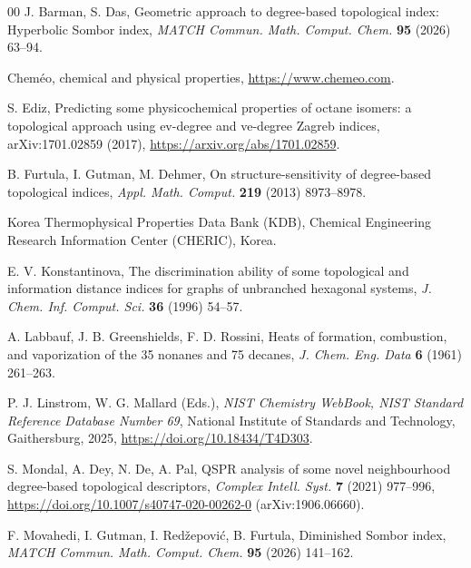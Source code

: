\documentclass[a5paper, 10pt]{article}
\theoremstyle{plain}
\theoremstyle{remark}
\theoremstyle{definition}
\begin{document}
\singlespacing
\begin{thebibliography}{00}
   J. Barman, S. Das, Geometric approach to
  degree-based topological index: Hyperbolic Sombor index, \textit{MATCH
  Commun. Math. Comput. Chem.\/} \textbf{95} (2026) 63--94.

   Chem\'eo, chemical and physical properties,
  \url{https://www.chemeo.com}.

  S. Ediz, Predicting some physicochemical properties of octane isomers:
  a topological approach using ev-degree and ve-degree Zagreb indices,
  arXiv:1701.02859 (2017), \url{https://arxiv.org/abs/1701.02859}.

   B. Furtula, I. Gutman, M. Dehmer, On
  structure-sensitivity of degree-based topological indices, \textit{Appl.
  Math. Comput.\/} \textbf{219} (2013) 8973--8978.

   Korea Thermophysical Properties Data Bank (KDB), Chemical
  Engineering Research Information Center (CHERIC), Korea.

   E. V. Konstantinova, The
  discrimination ability of some topological and information distance indices
  for graphs of unbranched hexagonal systems, \textit{J. Chem. Inf. Comput.
  Sci.\/} \textbf{36} (1996) 54--57.

   A. Labbauf, J. B. Greenshields,
  F. D. Rossini, Heats of formation, combustion, and vaporization of the
  35 nonanes and 75 decanes, \textit{J. Chem. Eng. Data\/} \textbf{6}
  (1961) 261--263.

   P. J. Linstrom, W. G. Mallard (Eds.), \textit{NIST
  Chemistry WebBook, NIST Standard Reference Database Number 69\/}, National
  Institute of Standards and Technology, Gaithersburg, 2025,
  \url{https://doi.org/10.18434/T4D303}.

  S. Mondal, A. Dey, N. De, A. Pal, QSPR analysis of some novel
  neighbourhood degree-based topological descriptors, \textit{Complex
  Intell. Syst.\/} \textbf{7} (2021) 977--996,
  \url{https://doi.org/10.1007/s40747-020-00262-0} (arXiv:1906.06660).

   F. Movahedi, I. Gutman, I.
  Red\v{z}epovi\'c, B. Furtula, Diminished Sombor index, \textit{MATCH Commun.
  Math. Comput. Chem.\/} \textbf{95} (2026) 141--162.


\end{thebibliography}
\end{document}
